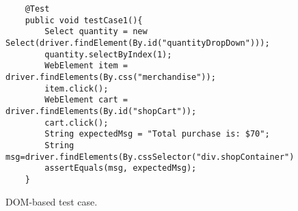 \begin{figure}
\begin{lstlisting}
	@Test
	public void testCase1(){
		Select quantity = new Select(driver.findElement(By.id("quantityDropDown")));
		quantity.selectByIndex(1);
		WebElement item = driver.findElements(By.css("merchandise"));
		item.click();
		WebElement cart = driver.findElements(By.id("shopCart"));
		cart.click();		
		String expectedMsg = "Total purchase is: $70";	
		String msg=driver.findElements(By.cssSelector("div.shopContainer")).getText();
		assertEquals(msg, expectedMsg);
	}
\end{lstlisting}
\vspace{-0.1in} 
\caption{DOM-based \selenium test case.}
\label{Fig:domTest}
\vspace{-0.2in} 
\end{figure}
